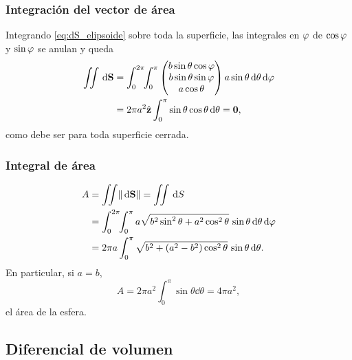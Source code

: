 \subsubsection{Integraci\'on del vector de \'area}
\label{subsubsec:integral_dS}

Integrando \eqref{eq:dS_elipsoide} sobre toda la superficie, las integrales en
$\varphi$ de $\cos\varphi$ y $\sin\varphi$ se anulan y queda
\begin{equation}
  \label{eq:integral_dS}
  \begin{aligned}
    \iint\,\mathrm{d}\mathbf{S}
      &=\int_{0}^{2\pi}\!\!\int_{0}^{\pi}
        \begin{pmatrix}
          b\sin\theta\cos\varphi\\
          b\sin\theta\sin\varphi\\
          a\cos\theta
        \end{pmatrix}
        a\sin\theta\,\mathrm{d}\theta\,\mathrm{d}\varphi\\
      &=2\pi a^2\hat{\mathbf{z}}\int_{0}^{\pi}\sin\theta\cos\theta\,\mathrm{d}\theta
       =\mathbf{0},
  \end{aligned}
\end{equation}
como debe ser para toda superficie cerrada.

\subsubsection{Integral de \'area}
\label{subsubsec:integral_area}

\begin{equation}
  \label{eq:area_elipsoide}
  \begin{aligned}
    A&=\iint\lVert \,\mathrm{d}\mathbf{S} \rVert=\iint\,\mathrm{d} S\\
     &=\int_{0}^{2\pi}\!\!\int_{0}^{\pi}
       a\sqrt{b^2\sin^2\theta+a^2\cos^2\theta}\,
       \sin\theta\,\mathrm{d}\theta\,\mathrm{d}\varphi\\
     &=2\pi a\int_{0}^{\pi}
       \sqrt{b^2+(a^2-b^2)\cos^2\theta}\,\sin\theta\,\mathrm{d}\theta .
  \end{aligned}
\end{equation}
En particular, si $a=b$,
\begin{equation}
  \label{eq:area_esfera}
  A=2\pi a^2\int_{0}^{\pi}\sin\theta\dd\theta=4\pi a^2,
\end{equation}
el \'area de la esfera.

\subsection{Diferencial de volumen}
\label{subsec:diferencial_volumen}

